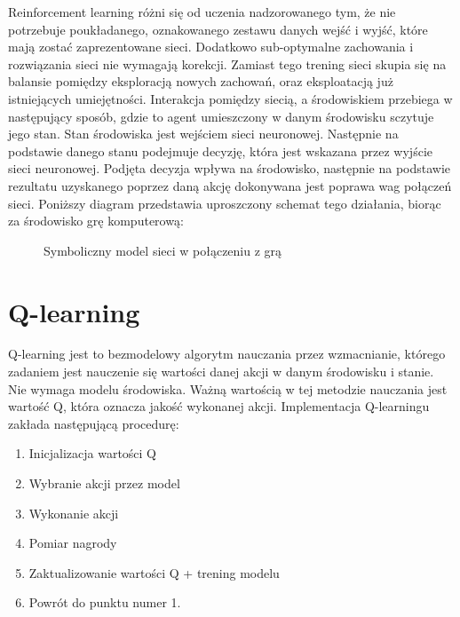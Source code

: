 Reinforcement learning różni się od uczenia nadzorowanego tym, że nie potrzebuje poukładanego, oznakowanego zestawu danych wejść i wyjść, które mają zostać zaprezentowane sieci. Dodatkowo sub-optymalne zachowania i rozwiązania sieci nie wymagają korekcji. Zamiast tego trening sieci skupia się na balansie pomiędzy eksploracją nowych zachowań, oraz eksploatacją już istniejących umiejętności.
Interakcja pomiędzy siecią, a środowiskiem przebiega w następujący sposób, gdzie to agent umieszczony w danym środowisku sczytuje jego stan. Stan środowiska jest wejściem sieci neuronowej. Następnie na podstawie danego stanu podejmuje decyzję, która jest wskazana przez wyjście sieci neuronowej. Podjęta decyzja wpływa na środowisko, następnie na podstawie rezultatu uzyskanego poprzez daną akcję dokonywana jest poprawa wag połączeń sieci. Poniższy diagram przedstawia uproszczony schemat tego działania, biorąc za środowisko grę komputerową:

\begin{figure}[h]
    \centering
    \caption{Symboliczny model sieci w połączeniu z grą}
    \label{img:rf_learning_diagram}
\end{figure}


\section{Q-learning}

Q-learning \cite{HandsOnQLearningWithPython} \cite{Qlearning} jest to bezmodelowy algorytm nauczania przez wzmacnianie, którego zadaniem jest nauczenie się wartości danej akcji w danym środowisku i stanie. Nie wymaga modelu środowiska. Ważną wartością w tej metodzie nauczania jest wartość Q, która oznacza jakość wykonanej akcji.
Implementacja Q-learningu zakłada następującą procedurę:

\begin{enumerate}
    \centering
    \item Inicjalizacja wartości Q
    \item Wybranie akcji przez model
    \item Wykonanie akcji
    \item Pomiar nagrody
    \item Zaktualizowanie wartości Q + trening modelu
    \item Powrót do punktu numer 1.
\end{enumerate}

